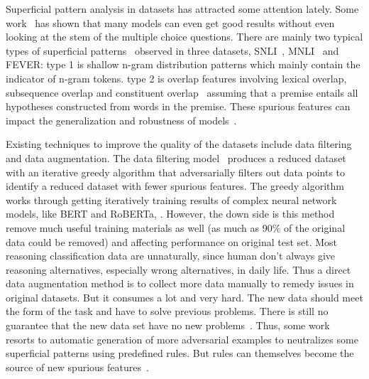 Superficial pattern analysis in datasets has attracted some attention lately. 
Some work~\cite{gururangan2018annotation,zellers2018swag} 
has shown that many models can even 
get good results without even looking at the stem of the multiple choice questions.
There are mainly two typical types of superficial patterns~\cite{naik2018stress,mccoy2019right,schuster2019towards,nie2019adversarial} observed 
in three datasets, SNLI~\cite{bowman2015large}, MNLI~\cite{williams2018broad} and FEVER: 
type 1 is shallow n-gram distribution patterns which mainly contain the indicator of n-gram tokens. 
type 2 is overlap features involving lexical overlap, 
subsequence overlap and constituent overlap~\cite{mccoy2019right} 
assuming that a premise entails all
hypotheses constructed from words
in the premise.%
These spurious features can impact the generalization 
and robustness of models~\cite{bras2020adversarial}.

Existing techniques to improve the quality of the datasets 
include data filtering and data augmentation.  
The data filtering model~\cite{bras2020adversarial} 
produces a reduced dataset with
an iterative greedy algorithm that adversarially filters out data points to
identify a reduced dataset with fewer spurious features. 
The greedy algorithm works through getting iteratively 
training results of complex neural network models, like BERT and RoBERTa, . 
However, the down side is this method remove much useful training materials as well
(as much as 90\% of the original data could be removed) and affecting performance on original test set.
Most reasoning classification data are unnaturally, since human don't 
always give reasoning alternatives, especially wrong alternatives, in daily life.
Thus a direct data augmentation method is to collect more data manually to remedy 
issues in original datasets. But it consumes a lot and very hard. The new data should meet the form of 
the task and have to solve previous problems. There is still no guarantee that the new data set have 
no new problems~\cite{williams2018broad}.
Thus, some work~\cite{mccoy2019right,min2020syntactic,wang2019if} resorts to automatic generation of 
more adversarial examples to neutralizes some superficial patterns using predefined rules. 
But rules can themselves become the source of new spurious features~\cite{jia2017adversarial,ribeiro2018semantically,iyyer2018adversarial,liu2019inoculation}.

